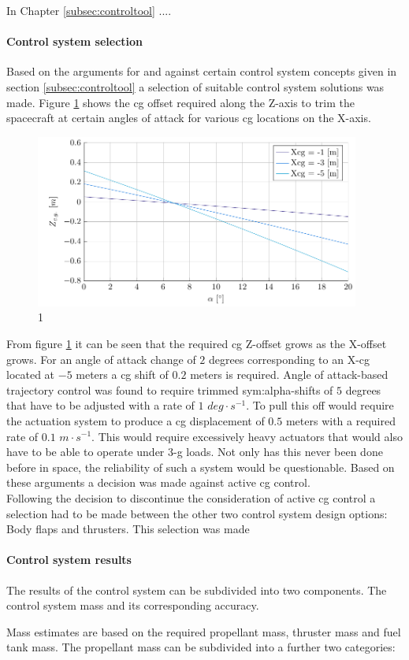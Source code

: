 
In Chapter \ref{subsec:controltool} ....






\paragraph{Control system selection}
Based on the arguments for and against certain control system concepts given in section \ref{subsec:controltool} a selection of suitable control system solutions was made. Figure \ref{fig:cgoffset} shows the \gls{cg} offset required along the Z-axis to trim the spacecraft at certain angles of attack for various \gls{cg} locations on the X-axis. 
\begin{figure}[h]
	\centering
	\includegraphics[width=0.95\textwidth]{./Figure/control/moment}
	\caption{1}
	\label{fig:cgoffset}
\end{figure}
From figure \ref{fig:cgoffset} it can be seen that the required \gls{cg} Z-offset grows as the X-offset grows. For an angle of attack change of $2$ degrees corresponding to an X-\gls{cg} located at $-5$ meters a \gls{cg} shift of $0.2$ meters is required. Angle of attack-based trajectory control was found to require trimmed \gls{sym:alpha}-shifts of $5$ degrees that have to be adjusted with a rate of $1$ $deg \cdot s^{-1}$. To pull this off would require the actuation system to produce a \gls{cg} displacement of $0.5$ meters with a required rate of $0.1$ $m \cdot s^{-1}$. This would require excessively heavy actuators that would also have to be able to operate under 3-g loads. Not only has this never been done before in space, the reliability of such a system would be questionable. Based on these arguments a decision was made against active \gls{cg} control.\\
Following the decision to discontinue the consideration of active \gls{cg} control a selection had to be made between the other two control system design options: Body flaps and thrusters. This selection was made 

\paragraph{Control system results}

The results of the control system can be subdivided into two components. The control system mass and its corresponding accuracy.

Mass estimates are based on the required propellant mass, thruster mass and fuel tank mass. The propellant mass can be subdivided into a further two categories: 